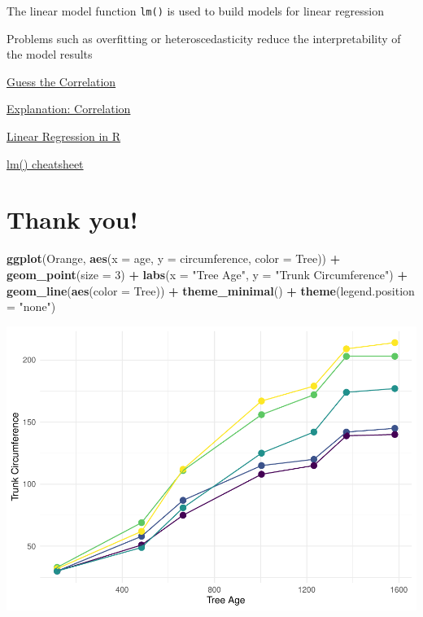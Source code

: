 \documentclass[
]{book}
\newenvironment{Shaded}{\begin{snugshade}}{\end{snugshade}}
\newcommand{\AttributeTok}[1]{\textcolor[rgb]{0.13,0.29,0.53}{#1}}
\newcommand{\DecValTok}[1]{\textcolor[rgb]{0.00,0.00,0.81}{#1}}
\newcommand{\FunctionTok}[1]{\textcolor[rgb]{0.13,0.29,0.53}{\textbf{#1}}}
\newcommand{\NormalTok}[1]{#1}
\newcommand{\SpecialCharTok}[1]{\textcolor[rgb]{0.81,0.36,0.00}{\textbf{#1}}}
\newcommand{\StringTok}[1]{\textcolor[rgb]{0.31,0.60,0.02}{#1}}
\begin{document}
The linear model function \texttt{lm()} is used to build models for linear regression

Problems such as overfitting or heteroscedasticity reduce the interpretability of the model results

\href{https://www.guessthecorrelation.com/}{Guess the Correlation}

\href{https://statisticsbyjim.com/basics/correlation-coefficient-formula/}{Explanation: Correlation}

\href{https://www.datacamp.com/tutorial/linear-regression-R}{Linear Regression in R}

\href{https://www.codecademy.com/learn/learn-linear-regression-in-r/modules/linear-regression-in-r/cheatsheet/}{lm() cheatsheet}

\section{Thank you!}\label{thank-you-2}

\begin{Shaded}
\begin{Highlighting}[]
\FunctionTok{ggplot}\NormalTok{(Orange, }\FunctionTok{aes}\NormalTok{(}\AttributeTok{x =}\NormalTok{ age, }\AttributeTok{y =}\NormalTok{ circumference, }\AttributeTok{color =}\NormalTok{ Tree)) }\SpecialCharTok{+}
  \FunctionTok{geom\_point}\NormalTok{(}\AttributeTok{size =} \DecValTok{3}\NormalTok{) }\SpecialCharTok{+} \FunctionTok{labs}\NormalTok{(}\AttributeTok{x =} \StringTok{"Tree Age"}\NormalTok{, }\AttributeTok{y =} \StringTok{"Trunk Circumference"}\NormalTok{) }\SpecialCharTok{+}
  \FunctionTok{geom\_line}\NormalTok{(}\FunctionTok{aes}\NormalTok{(}\AttributeTok{color =}\NormalTok{ Tree)) }\SpecialCharTok{+} \FunctionTok{theme\_minimal}\NormalTok{() }\SpecialCharTok{+} \FunctionTok{theme}\NormalTok{(}\AttributeTok{legend.position =} \StringTok{"none"}\NormalTok{)}
\end{Highlighting}
\end{Shaded}

\includegraphics{_main_files/figure-latex/unnamed-chunk-84-1.pdf}
\end{document}
